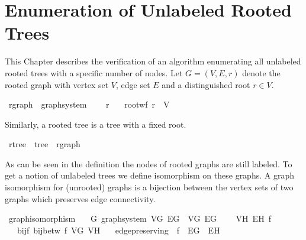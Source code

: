 \chapter{Enumeration of Unlabeled Rooted Trees}\label{chapter:rootred_tree_enum}

This Chapter describes the verification of an algorithm enumerating all unlabeled rooted trees with a specific number of nodes.
Let $G = (V,E,r)$ denote the rooted graph with vertex set $V$, edge set $E$ and a distinguished root $r \in V$.

\begin{isabellebox}
\isamarkupfalse%
\ rgraph\ {\isacharequal}{\kern0pt}\ graph{\isacharunderscore}{\kern0pt}system\ {\isacharplus}{\kern0pt}\isanewline
\ \ \ r\isanewline
\ \ \ root{\isacharunderscore}{\kern0pt}wf{\isacharcolon}{\kern0pt}\ {\isachardoublequoteopen}r\ {\isasymin}\ V{\isachardoublequoteclose}
\end{isabellebox}

Similarly, a rooted tree is a tree with a fixed root.

\begin{isabellebox}
    \isamarkupfalse%
    \ rtree\ {\isacharequal}{\kern0pt}\ tree\ {\isacharplus}{\kern0pt}\ rgraph
\end{isabellebox}

As can be seen in the definition the nodes of rooted graphs are still labeled.
To get a notion of unlabeled trees we define isomorphism on these graphs.
A graph isomorphism for (unrooted) graphs is a bijection between the vertex sets of two graphs which preserves edge connectivity.

\begin{isabellebox}
\isamarkupfalse%
\ graph{\isacharunderscore}{\kern0pt}isomorphism\ {\isacharequal}{\kern0pt}\isanewline
\ \ G{\isacharcolon}{\kern0pt}\ graph{\isacharunderscore}{\kern0pt}system\ V\isactrlsub G\ E\isactrlsub G\ \ V\isactrlsub G\ E\isactrlsub G\ {\isacharplus}{\kern0pt}\isanewline
\ \ \ V\isactrlsub H\ E\isactrlsub H\ f\isanewline
\ \ \ bij{\isacharunderscore}{\kern0pt}f{\isacharcolon}{\kern0pt}\ {\isachardoublequoteopen}bij{\isacharunderscore}{\kern0pt}betw\ f\ V\isactrlsub G\ V\isactrlsub H{\isachardoublequoteclose}\isanewline
\ \ \ edge{\isacharunderscore}{\kern0pt}preserving{\isacharcolon}{\kern0pt}\ {\isachardoublequoteopen}{\isacharparenleft}{\kern0pt}{\isacharparenleft}{\kern0pt}{\isacharbackquote}{\kern0pt}{\isacharparenright}{\kern0pt}\ f{\isacharparenright}{\kern0pt}\ {\isacharbackquote}{\kern0pt}\ E\isactrlsub G\ {\isacharequal}{\kern0pt}\ E\isactrlsub H{\isachardoublequoteclose}
\end{isabellebox}

